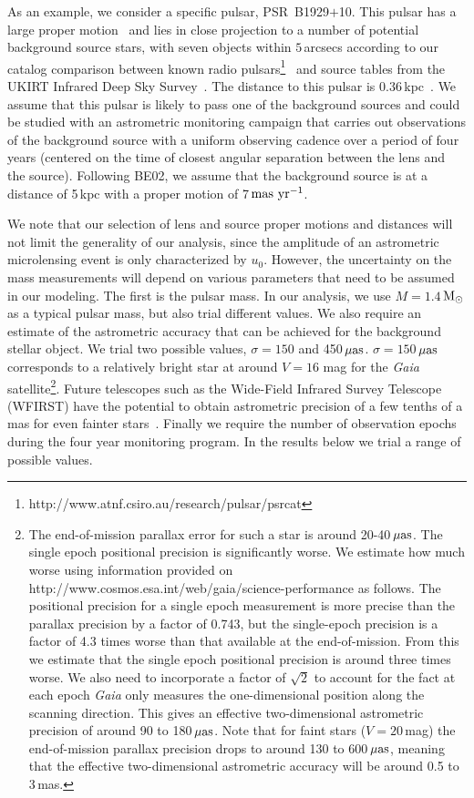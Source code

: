\documentclass[iop,apj]{emulateapj}
\begin{document}
As an example, we consider a specific pulsar, PSR~B1929$+$10. This pulsar has a large 
proper motion~\citep[103\,$\rm{mas\ yr^{-1}}$;][]{Chatterjee04} and lies in close projection 
to a number of potential background source stars, with seven objects within $5$\,arcsecs 
according to our catalog comparison between known radio pulsars\footnote{http://www.atnf.csiro.au/research/pulsar/psrcat}~\citep{Manchester05} 
and source tables from the UKIRT Infrared Deep Sky Survey~\citep[UKIDSS; ][]{Lawrence}.  
The distance to this pulsar is $0.36$\,kpc~\citep{Chatterjee04}. We assume that this pulsar 
is likely to pass one of the background sources and could be studied with an astrometric 
monitoring campaign that carries out observations of the background source with a uniform 
observing cadence over a period of four years (centered on the time of closest angular 
separation between the lens and the source). Following BE02, we assume that the background 
source is at a distance of 5\,kpc with a proper motion of 7\,$\rm{mas\ yr^{-1}}$.

We note that our selection of lens and source proper motions and distances will not 
limit the generality of our analysis, since the amplitude of an astrometric microlensing 
event is only characterized by $u_0$.  
%
However, the uncertainty on the mass measurements will depend on various parameters that 
need to be assumed in our modeling. The first is the pulsar mass. In our analysis, we use  
$M=1.4$\,$\rm{M_{\odot}}$ as a typical pulsar mass, but also trial different values. We also 
require an estimate of the astrometric accuracy that can be achieved for the background stellar 
object. We trial two possible values, $\sigma=150$ and 450\,$\rm{\mu as}$. $\sigma=150$\,$\rm{\mu as}$ 
corresponds to a relatively bright star at around $V=16$ mag for the \textit{Gaia} satellite\footnote{The 
end-of-mission parallax error for such a star is around 20-40\,$\rm{\mu as}$. 
The single epoch positional precision is significantly worse. We estimate how much worse using 
information provided on http://www.cosmos.esa.int/web/gaia/science-performance as follows. The 
positional precision for a single epoch measurement is more precise than the parallax precision 
by a factor of 0.743, but the single-epoch precision is a factor of 4.3 times worse than 
that available at the end-of-mission.  From this we estimate that the single epoch 
positional precision is around three times worse.  We also need to incorporate 
a factor of $\sqrt{2}$ to account for the fact at each epoch \textit{Gaia} only measures 
the one-dimensional position along the scanning direction. This gives an effective two-dimensional 
astrometric precision of around 90 to 180\,$\rm{\mu as}$. Note that for faint stars ($V=20$\,mag) 
the end-of-mission parallax precision drops to around 130 to 600\,$\rm{\mu as}$, meaning 
that the effective two-dimensional astrometric accuracy will be around 0.5 to 3\,mas.}. 
Future telescopes such as the Wide-Field Infrared Survey Telescope (WFIRST) have the 
potential to obtain astrometric precision of a few tenths of a mas for even fainter 
stars~\citep[e.g.,][]{Spergel}. Finally we require the number of observation epochs during 
the four year monitoring program. In the results below we trial a range of possible values.
\end{document}
